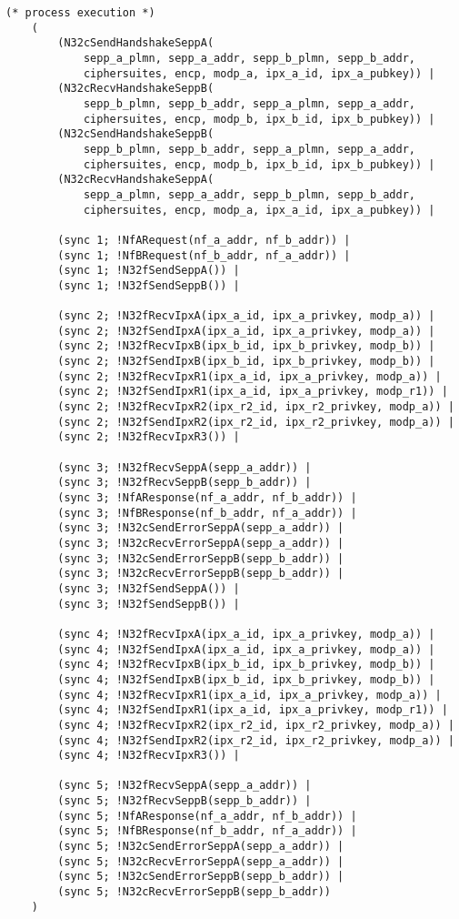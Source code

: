 \begin{lstlisting}[caption={Definition of the main process},label={lst:main-proc},firstnumber=1521]
    (* process execution *)
    (
        (N32cSendHandshakeSeppA(
            sepp_a_plmn, sepp_a_addr, sepp_b_plmn, sepp_b_addr,
            ciphersuites, encp, modp_a, ipx_a_id, ipx_a_pubkey)) |
        (N32cRecvHandshakeSeppB(
            sepp_b_plmn, sepp_b_addr, sepp_a_plmn, sepp_a_addr,
            ciphersuites, encp, modp_b, ipx_b_id, ipx_b_pubkey)) |
        (N32cSendHandshakeSeppB(
            sepp_b_plmn, sepp_b_addr, sepp_a_plmn, sepp_a_addr,
            ciphersuites, encp, modp_b, ipx_b_id, ipx_b_pubkey)) |
        (N32cRecvHandshakeSeppA(
            sepp_a_plmn, sepp_a_addr, sepp_b_plmn, sepp_b_addr,
            ciphersuites, encp, modp_a, ipx_a_id, ipx_a_pubkey)) |

        (sync 1; !NfARequest(nf_a_addr, nf_b_addr)) |
        (sync 1; !NfBRequest(nf_b_addr, nf_a_addr)) |
        (sync 1; !N32fSendSeppA()) |
        (sync 1; !N32fSendSeppB()) |

        (sync 2; !N32fRecvIpxA(ipx_a_id, ipx_a_privkey, modp_a)) |
        (sync 2; !N32fSendIpxA(ipx_a_id, ipx_a_privkey, modp_a)) |
        (sync 2; !N32fRecvIpxB(ipx_b_id, ipx_b_privkey, modp_b)) |
        (sync 2; !N32fSendIpxB(ipx_b_id, ipx_b_privkey, modp_b)) |
        (sync 2; !N32fRecvIpxR1(ipx_a_id, ipx_a_privkey, modp_a)) |
        (sync 2; !N32fSendIpxR1(ipx_a_id, ipx_a_privkey, modp_r1)) |
        (sync 2; !N32fRecvIpxR2(ipx_r2_id, ipx_r2_privkey, modp_a)) |
        (sync 2; !N32fSendIpxR2(ipx_r2_id, ipx_r2_privkey, modp_a)) |
        (sync 2; !N32fRecvIpxR3()) |

        (sync 3; !N32fRecvSeppA(sepp_a_addr)) |
        (sync 3; !N32fRecvSeppB(sepp_b_addr)) |
        (sync 3; !NfAResponse(nf_a_addr, nf_b_addr)) |
        (sync 3; !NfBResponse(nf_b_addr, nf_a_addr)) |
        (sync 3; !N32cSendErrorSeppA(sepp_a_addr)) |
        (sync 3; !N32cRecvErrorSeppA(sepp_a_addr)) |
        (sync 3; !N32cSendErrorSeppB(sepp_b_addr)) |
        (sync 3; !N32cRecvErrorSeppB(sepp_b_addr)) |
        (sync 3; !N32fSendSeppA()) |
        (sync 3; !N32fSendSeppB()) |

        (sync 4; !N32fRecvIpxA(ipx_a_id, ipx_a_privkey, modp_a)) |
        (sync 4; !N32fSendIpxA(ipx_a_id, ipx_a_privkey, modp_a)) |
        (sync 4; !N32fRecvIpxB(ipx_b_id, ipx_b_privkey, modp_b)) |
        (sync 4; !N32fSendIpxB(ipx_b_id, ipx_b_privkey, modp_b)) |
        (sync 4; !N32fRecvIpxR1(ipx_a_id, ipx_a_privkey, modp_a)) |
        (sync 4; !N32fSendIpxR1(ipx_a_id, ipx_a_privkey, modp_r1)) |
        (sync 4; !N32fRecvIpxR2(ipx_r2_id, ipx_r2_privkey, modp_a)) |
        (sync 4; !N32fSendIpxR2(ipx_r2_id, ipx_r2_privkey, modp_a)) |
        (sync 4; !N32fRecvIpxR3()) |

        (sync 5; !N32fRecvSeppA(sepp_a_addr)) |
        (sync 5; !N32fRecvSeppB(sepp_b_addr)) |
        (sync 5; !NfAResponse(nf_a_addr, nf_b_addr)) |
        (sync 5; !NfBResponse(nf_b_addr, nf_a_addr)) |
        (sync 5; !N32cSendErrorSeppA(sepp_a_addr)) |
        (sync 5; !N32cRecvErrorSeppA(sepp_a_addr)) |
        (sync 5; !N32cSendErrorSeppB(sepp_b_addr)) |
        (sync 5; !N32cRecvErrorSeppB(sepp_b_addr))
    )
\end{lstlisting}

